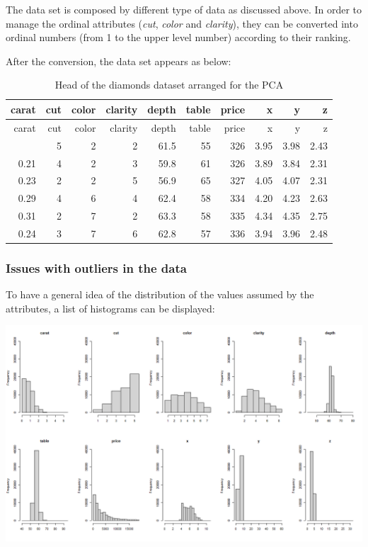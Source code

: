 \documentclass[
]{article}
\begin{document}
The data set is composed by different type of data as discussed above.
In order to manage the ordinal attributes (\emph{cut}, \emph{color} and
\emph{clarity}), they can be converted into ordinal numbers (from 1 to
the upper level number) according to their ranking.

After the conversion, the data set appears as below:

\begin{longtable}[]{@{}rrrrrrrrrr@{}}
\caption{Head of the diamonds dataset arranged for the
PCA}\tabularnewline
\toprule\noalign{}
carat & cut & color & clarity & depth & table & price & x & y & z \\
\midrule\noalign{}
\endfirsthead
\toprule\noalign{}
carat & cut & color & clarity & depth & table & price & x & y & z \\
\midrule\noalign{}
\endhead
\bottomrule\noalign{}
\endlastfoot
0.23 & 5 & 2 & 2 & 61.5 & 55 & 326 & 3.95 & 3.98 & 2.43 \\
0.21 & 4 & 2 & 3 & 59.8 & 61 & 326 & 3.89 & 3.84 & 2.31 \\
0.23 & 2 & 2 & 5 & 56.9 & 65 & 327 & 4.05 & 4.07 & 2.31 \\
0.29 & 4 & 6 & 4 & 62.4 & 58 & 334 & 4.20 & 4.23 & 2.63 \\
0.31 & 2 & 7 & 2 & 63.3 & 58 & 335 & 4.34 & 4.35 & 2.75 \\
0.24 & 3 & 7 & 6 & 62.8 & 57 & 336 & 3.94 & 3.96 & 2.48 \\
\end{longtable}

\subsubsection{Issues with outliers in the
data}\label{issues-with-outliers-in-the-data}

To have a general idea of the distribution of the values assumed by the
attributes, a list of histograms can be displayed:

\begin{center}\includegraphics[width=0.6\linewidth]{Images/hist_w_out} \end{center}
\end{document}
